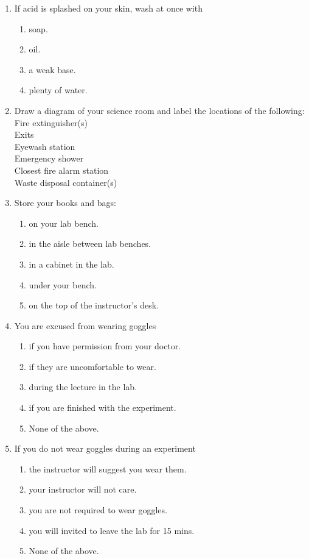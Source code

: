 \documentclass[cover.tex]{subfiles}
\begin{document}
\begin{refsection}
\begin{multicols*}{2}
\begin{enumerate}
\item If acid is splashed on your skin, wash at once with
\begin{enumerate}[label=(\alph*)]
\item soap.
\item oil.
\item a weak base.
\item plenty of water.
\end{enumerate}

\item Draw a diagram of your science room and label the locations of the following:\\
 Fire extinguisher(s)\\
 Exits\\
 Eyewash station\\
 Emergency shower\\
 Closest fire alarm station\\
 Waste disposal container(s)

\item Store your books and bags: 
\begin{enumerate}[label=(\alph*)]
\item  on your lab bench. 
\item  in the aisle between lab benches. 
\item  in a cabinet in the lab. 
\item  under your bench. 
\item  on the top of the instructor's desk. 
\end{enumerate}

\item You are excused from wearing goggles
\begin{enumerate}[label=(\alph*)]
\item if you have permission from your doctor.
\item if they are uncomfortable to wear. 
\item during the lecture in the lab.
\item if you are finished with the experiment.
\item None of the above.
\end{enumerate}

\item If you do not wear goggles during an experiment
\begin{enumerate}[label=(\alph*)]
\item the instructor will suggest you wear them.
\item your instructor will not care.
\item you are not required to wear goggles.
\item you will invited to leave the lab for 15 mins.
\item None of the above.
\end{enumerate}


\end{enumerate}
\end{multicols*}
\end{refsection}
\end{document}
